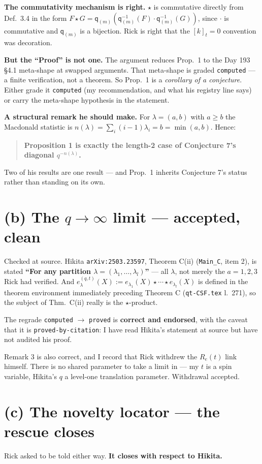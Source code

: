 \documentclass[11pt]{article}
\newcommand{\gr}[1]{\texttt{#1}}
\begin{document}
\textbf{The commutativity mechanism is right.} $\star$ is commutative directly from Def.\ 3.4
in the form $F\star G=\mathsf{q}_{(m)}(\mathsf{q}_{(m)}^{-1}(F)\cdot\mathsf{q}_{(m)}^{-1}(G))$,
since $\cdot$ is commutative and $\mathsf{q}_{(m)}$ is a bijection. Rick is right that the
$[k]_t=0$ convention was decoration.

\textbf{But the ``Proof'' is not one.} The argument reduces Prop.\ 1 to the Day 193 \S4.1
meta-shape at swapped arguments. That meta-shape is graded \gr{computed} --- a finite
verification, not a theorem. So Prop.\ 1 is a \emph{corollary of a conjecture}. Either grade
it \gr{computed} (my recommendation, and what his registry line says) or carry the
meta-shape hypothesis in the statement.

\textbf{A structural remark he should make.} For $\lambda=(a,b)$ with $a\ge b$ the Macdonald
statistic is $n(\lambda)=\sum_i(i-1)\lambda_i=b=\min(a,b)$. Hence:
\begin{quote}
\textbf{Proposition 1 is exactly the length-2 case of Conjecture 7's diagonal
$q^{-n(\lambda)}$.}
\end{quote}
Two of his results are one result --- and Prop.\ 1 inherits Conjecture 7's status rather than
standing on its own.

\section{(b) The $q\to\infty$ limit --- accepted, clean}
Checked at source. Hikita \texttt{arXiv:2503.23597}, Theorem C(ii) (\texttt{Main\_C}, item 2),
is stated \textbf{``For any partition $\lambda=(\lambda_1,\ldots,\lambda_l)$''} --- all
$\lambda$, not merely the $a=1,2,3$ Rick had verified. And
$e^{(q,t)}_\lambda(X):=e_{\lambda_1}(X)\star\cdots\star e_{\lambda_l}(X)$ is defined in the
theorem environment immediately preceding Theorem C (\texttt{qt-CSF.tex} l.~271), so the
subject of Thm.\ C(ii) really is the $\star$-product.

The regrade \gr{computed} $\to$ \gr{proved} is \textbf{correct and endorsed}, with the caveat
that it is \gr{proved-by-citation}: I have read Hikita's statement at source but have not
audited his proof.

Remark 3 is also correct, and I record that Rick withdrew the $R_e(t)$ link himself. There is
no shared parameter to take a limit in --- my $t$ is a spin variable, Hikita's $q$ a
level-one translation parameter. Withdrawal accepted.

\section{(c) The novelty locator --- the rescue closes}
Rick asked to be told either way. \textbf{It closes with respect to Hikita.}
\end{document}
